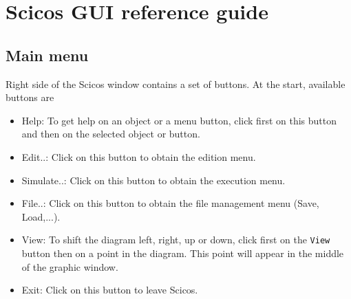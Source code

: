







\newpage
\appendix
\section{Scicos  GUI reference guide}
\subsection{Main menu}
Right side of the Scicos  window contains a set of buttons. 
At the start, available buttons are 
\begin{itemize}
\item {Help:} To get help on an object or a menu button, click first on
  this button and then on the selected object or button.
\item {Edit..:} Click on this button to obtain the edition menu.
\item {Simulate..:} Click on this button to obtain the execution menu.
\item {File..:}  Click on this button to obtain the file management menu
  (Save, Load,...).
\item {View:} To shift the diagram left, right, up or down, click first
  on the {\tt View} button then on a point in the diagram. This point
  will appear in the middle of the graphic window.
\item {Exit:} Click on this button to leave Scicos.   
\end{itemize}
